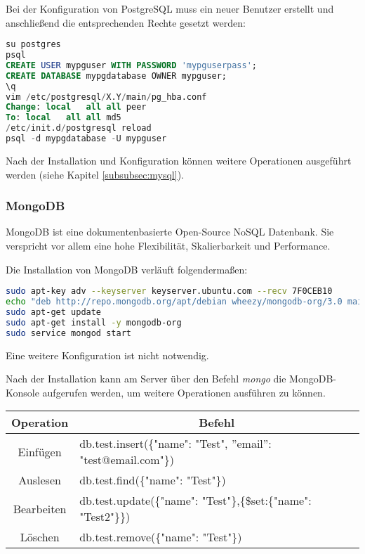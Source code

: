 Bei der Konfiguration von PostgreSQL muss ein neuer Benutzer erstellt und anschließend die entsprechenden Rechte gesetzt werden:
\begin{lstlisting}[caption=Konfiguration von PostgreSQL \cite{POSTGRES}, language=SQL]
su postgres
psql
CREATE USER mypguser WITH PASSWORD 'mypguserpass';
CREATE DATABASE mypgdatabase OWNER mypguser;
\q
vim /etc/postgresql/X.Y/main/pg_hba.conf
Change: local	all	all	peer
To: local	all	all	md5
/etc/init.d/postgresql reload
psql -d mypgdatabase -U mypguser
\end{lstlisting}

Nach der Installation und Konfiguration können weitere Operationen ausgeführt werden (siehe Kapitel \ref{subsubsec:mysql}).

\subsubsection{MongoDB}
MongoDB ist eine dokumentenbasierte Open-Source NoSQL Datenbank. Sie verspricht vor allem eine hohe Flexibilität, Skalierbarkeit und Performance. \cite{ABOUTMONGODB}

Die Installation von MongoDB verläuft folgendermaßen:
\begin{lstlisting}[caption=Installation von MongoDB \cite{MONGODBINSTALL}, language=bash]
sudo apt-key adv --keyserver keyserver.ubuntu.com --recv 7F0CEB10
echo "deb http://repo.mongodb.org/apt/debian wheezy/mongodb-org/3.0 main" | sudo tee /etc/apt/sources.list.d/mongodb-org-3.0.list
sudo apt-get update
sudo apt-get install -y mongodb-org
sudo service mongod start
\end{lstlisting}
Eine weitere Konfiguration ist nicht notwendig.

\newpage

Nach der Installation kann am Server über den Befehl \textit{mongo}  die MongoDB-Konsole aufgerufen werden, um weitere Operationen ausführen zu können.

\begin{table}[htb]
\def\arraystretch{1.3}
\centering
\begin{tabular}{|c|l|}
\hline
\textbf{Operation} & \multicolumn{1}{c|}{\textbf{Befehl}}                            \\ \hline
Einfügen           & db.test.insert(\{"name": "Test", ''email'': "test@email.com"\})                    \\ \hline
Auslesen           & db.test.find(\{"name": "Test"\}) \\ \hline
Bearbeiten         & db.test.update(\{"name": "Test"\},\{\$set:\{"name": "Test2"\}\}) \\ \hline
Löschen            & db.test.remove(\{"name": "Test"\}) \\ \hline
\end{tabular}
\end{table}

